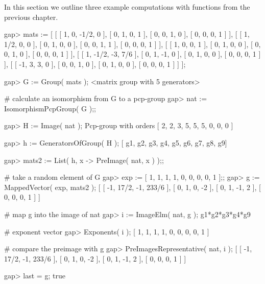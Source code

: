 
In this section we outline three example computations with functions
from the previous chapter. 


\beginexample
gap> mats := 
[ [ [ 1, 0, -1/2, 0 ], [ 0, 1, 0, 1 ], [ 0, 0, 1, 0 ], [ 0, 0, 0, 1 ] ],
  [ [ 1, 1/2, 0, 0 ], [ 0, 1, 0, 0 ], [ 0, 0, 1, 1 ], [ 0, 0, 0, 1 ] ],
  [ [ 1, 0, 0, 1 ], [ 0, 1, 0, 0 ], [ 0, 0, 1, 0 ], [ 0, 0, 0, 1 ] ],
  [ [ 1, -1/2, -3, 7/6 ], [ 0, 1, -1, 0 ], [ 0, 1, 0, 0 ], [ 0, 0, 0, 1 ] ],
  [ [ -1, 3, 3, 0 ], [ 0, 0, 1, 0 ], [ 0, 1, 0, 0 ], [ 0, 0, 0, 1 ] ] ];

gap> G := Group( mats );
<matrix group with 5 generators>

# calculate an isomorphism from G to a pcp-group
gap> nat := IsomorphismPcpGroup( G );;   
     
gap> H := Image( nat );
Pcp-group with orders [ 2, 2, 3, 5, 5, 5, 0, 0, 0 ]

gap> h := GeneratorsOfGroup( H );
[ g1, g2, g3, g4, g5, g6, g7, g8, g9]

gap> mats2 := List( h, x -> PreImage( nat, x ) );;

# take a random element of G
gap> exp :=  [ 1, 1, 1, 1, 0, 0, 0, 0, 1 ];;
gap> g := MappedVector( exp, mats2 );
[ [ -1, 17/2, -1, 233/6 ], 
  [ 0, 1, 0, -2 ], 
  [ 0, 1, -1, 2 ], 
  [ 0, 0, 0, 1 ] ]

# map g into the image of nat
gap> i := ImageElm( nat, g );
g1*g2*g3*g4*g9

# exponent vector 
gap> Exponents( i );
[ 1, 1, 1, 1, 0, 0, 0, 0, 1 ]

# compare the preimage with g
gap> PreImagesRepresentative( nat, i );
[ [ -1, 17/2, -1, 233/6 ], 
  [ 0, 1, 0, -2 ], 
  [ 0, 1, -1, 2 ], 
  [ 0, 0, 0, 1 ] ]


gap> last = g;
true

\endexample


